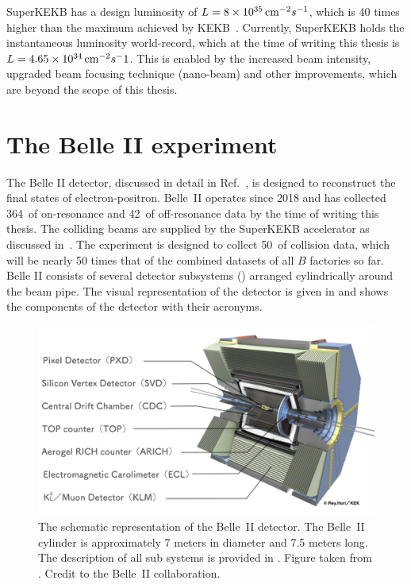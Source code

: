 SuperKEKB has a design luminosity of $L=8\times10^{35}{\rm \,cm}^{-2}s^{-1}$, which is 40 times higher than the maximum achieved by KEKB~\cite{Funakoshi:2022dai}.
Currently, SuperKEKB holds the instantaneous luminosity world-record, which at the time of writing this thesis is $L = 4.65\times10^{34}{\rm \,cm}^{-2}s^-1$.
This is enabled by the increased beam intensity, upgraded beam focusing technique (nano-beam) and other improvements, which are beyond the scope of this thesis.


\section{The Belle II experiment}\label{sec:belle2}
The Belle II detector, discussed in detail in Ref.~\cite{Belle-II:2010dht}, is designed to reconstruct the final states of electron-positron.
Belle~II operates since 2018 and has collected 364~\invfb of on-resonance and 42~\invfb of off-resonance data by the time of writing this thesis.
The colliding beams are supplied by the SuperKEKB accelerator as discussed in~.
The experiment is designed to collect 50~\invab of collision data, which will be nearly 50 times that of the combined datasets of all $B$ factories so far.
Belle II consists of several detector subsystems () arranged cylindrically around the beam pipe. 
The visual representation of the detector is given in  and shows the components of the detector with their acronyms.
\begin{figure}[htbp!]
    \includegraphics[width=1\textwidth]{figures/experimental_setup/belle2.png}
    \caption{\label{fig:belle2_detector} The schematic representation of the Belle~II detector.
    The Belle~II cylinder is approximately 7 meters in diameter and 7.5 meters long.
    The description of all sub systems is provided in .
    Figure taken from \cite{belle_2_picture}.
    Credit to the Belle~II collaboration.
    }
\end{figure}

